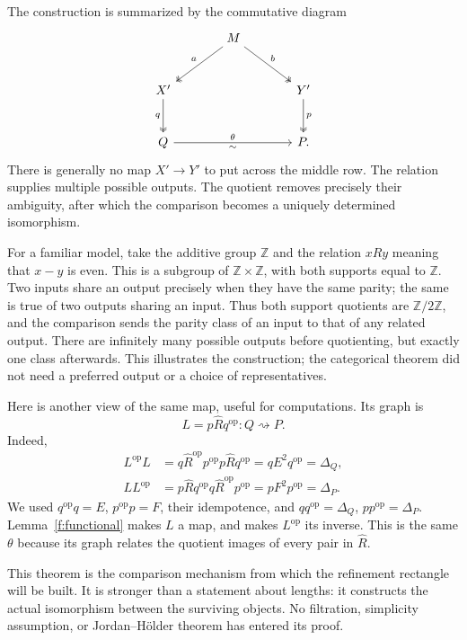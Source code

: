 \documentclass[11pt]{article}
\theoremstyle{definition}
\theoremstyle{remark}\newtheorem{remark}[theorem]{Remark}
\begin{document}
The construction is summarized by the commutative diagram
\[
\begin{tikzcd}[column sep=large,row sep=large]
&M \arrow[dl,two heads,"a"'] \arrow[dr,two heads,"b"]&\\
X' \arrow[d,two heads,"q"'] &&Y' \arrow[d,two heads,"p"]\\
Q \arrow[rr,"\theta", "\sim"'] &&P.
\end{tikzcd}
\]
There is generally no map $X'\to Y'$ to put across the middle row.
The relation supplies multiple possible outputs. The quotient removes
precisely their ambiguity, after which the comparison becomes a
uniquely determined isomorphism.

For a familiar model, take the additive group $\mathbb Z$ and the relation
$xRy$ meaning that $x-y$ is even. This is a subgroup of
$\mathbb Z\times\mathbb Z$, with both supports equal to $\mathbb Z$.
Two inputs share an output precisely when they have the same parity;
the same is true of two outputs sharing an input. Thus both support
quotients are $\mathbb Z/2\mathbb Z$, and the comparison sends the parity
class of an input to that of any related output. There are infinitely
many possible outputs before quotienting, but exactly one class afterwards.
This illustrates the construction; the categorical theorem did not need
a preferred output or a choice of representatives.

Here is another view of the same map, useful for computations. Its
graph is
\[
L=p\widehat Rq^{\mathrm{op}}:Q\rightsquigarrow P.
\]
Indeed,
\begin{align*}
L^{\mathrm{op}}L
 &=q\widehat R^{\mathrm{op}}p^{\mathrm{op}}p
       \widehat Rq^{\mathrm{op}}
   =qE^2q^{\mathrm{op}}=\Delta_Q,\\
LL^{\mathrm{op}}
 &=p\widehat Rq^{\mathrm{op}}q
       \widehat R^{\mathrm{op}}p^{\mathrm{op}}
   =pF^2p^{\mathrm{op}}=\Delta_P.
\end{align*}
We used $q^{\mathrm{op}}q=E$, $p^{\mathrm{op}}p=F$, their
idempotence, and $qq^{\mathrm{op}}=\Delta_Q$,
$pp^{\mathrm{op}}=\Delta_P$. Lemma~\ref{f:functional} makes $L$ a
map, and makes $L^{\mathrm{op}}$ its inverse. This is the same $\theta$
because its graph relates the quotient images of every pair in
$\widehat R$.

This theorem is the comparison mechanism from which the refinement
rectangle will be built. It is stronger than a statement about lengths:
it constructs the actual isomorphism between the surviving objects.
No filtration, simplicity assumption, or Jordan--H\"older theorem has
entered its proof.
\end{document}
